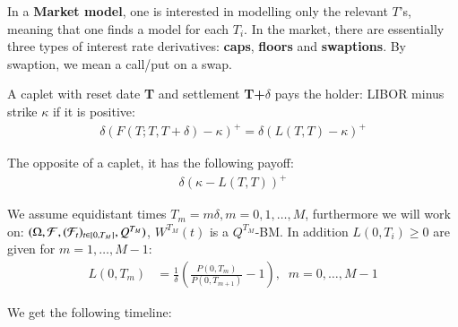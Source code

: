 \newpage 

In a \textbf{Market model}, one is interested in modelling only the relevant $T$'s, meaning that one finds a model for each $T_{i}$. In the market, there are essentially three types of interest rate derivatives: \textbf{caps}, \textbf{floors} and 
\textbf{swaptions}. By swaption, we mean a call/put on a swap.

\begin{definition}
A caplet with reset date \textbf{T} and settlement \textbf{T+$\delta$} pays the holder: LIBOR minus strike $\kappa$ if it is positive: 
\begin{align*}
\delta(F(T;T,T+\delta) -\kappa)^{+} = \delta(L(T,T)-\kappa)^{+}
\end{align*}
\end{definition} 

\begin{definition}
The opposite of a caplet, it has the following payoff: 
\begin{align*}
\delta(\kappa - L(T,T))^{+}    
\end{align*}
\end{definition}

We assume equidistant times $T_{m} = m\delta, m = 0, 1, \dots, M$, furthermore we will work on: 
$(\Omega, \mathcal{F}, (\mathcal{F}_{t})_{t\in [0,T_{M}]}, Q^{T_{M}})$, $W^{T_{M}}(t)$ is a $Q^{T_{M}}$-BM. In addition $L(0,T_{i})\geq 0 $ are given for $m = 1, \dots, M-1$: 
\begin{align*}
L(0,T_{m}) &= \frac{1}{\delta}\left(
\frac{P(0,T_{m})}{P(0,T_{m+1})}-1
\right), \;\; m = 0, \dots, M-1   
\end{align*}

We get the following timeline:




